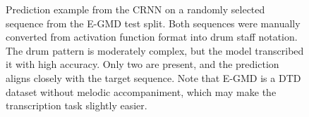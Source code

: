 \begin{figure}[H]
    \centering
    \caption{Prediction example from the \acrfull{CRNN} on a randomly selected sequence from the E-GMD test split. Both sequences were manually converted from activation function format into drum staff notation. The drum pattern is moderately complex, but the model transcribed it with high accuracy. Only two  are present, and the prediction aligns closely with the target sequence. Note that E-GMD is a \gls{DTD} dataset without melodic accompaniment, which may make the transcription task slightly easier.}
    \label{ArchitecturePredictionComparisonEGMDFigure}
\end{figure}

